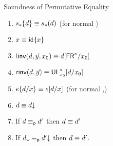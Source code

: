 \begin{theorem}{Soundness of Permutative Equality} \label{thm:permutative-soundess}
\begin{enumerate}
\item $s_*\{d\} \equiv s_*(d)$ (for normal \D)
\item $x \equiv {\ensuremath{\mathsf{id}}\{x\}}$
\item $\mathsf{linv}(d,\vec{y},x_0) \equiv d[\mathsf{FR}^*/x_0]$
\item $\mathsf{rinv}(d,\vec{y}) \equiv \mathsf{UL}^*_{x_0}[d/x_0]$
\item $e\{d/x\} \equiv e[d/x]$ (for normal \D,\E)
\item $d \equiv d\mathord{\downarrow}$
\item If $d \equiv_{\mathsf{p}} d'$ then $d \equiv d'$
\item If $d\mathord{\downarrow} \equiv_{\mathsf{p}} d'\mathord{\downarrow}$ then $d \equiv d'$.  
\end{enumerate}
\end{theorem}
